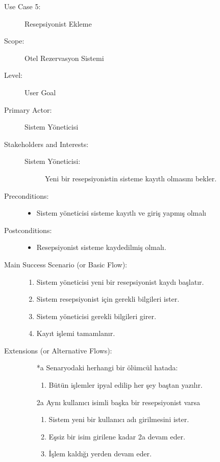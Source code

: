 \documentclass[12pt,a4paper]{report}
\begin{document}
\newpage
\begin{description}
\item[Use Case 5:] Resepsiyonist Ekleme\\
\item[Scope:] Otel Rezervasyon Sistemi
\item[Level:] User Goal
\item[Primary Actor:] Sistem Yöneticisi 
\item[Stakeholders and Interests:] \hspace{10 mm}
\begin{description} 
\item[Sistem Yöneticisi:] Yeni bir resepsiyonistin sisteme kayıtlı olmasını bekler.
\end{description}
\item[Preconditions:] \hspace{10mm}
\begin{itemize}
\item Sistem yöneticisi sisteme kayıtlı ve giriş yapmış olmalı
\end{itemize}

\item[Postconditions:] \hspace{10mm}
\begin{itemize}
\item Resepsiyonist sisteme kaydedilmiş olmalı.
\end{itemize}
\item[Main Success Scenario (or Basic Flow):] \hspace{10mm}
\begin{enumerate}
\item Sistem yöneticisi yeni bir resepsiyonist kaydı başlatır.
\item Sistem resepsiyonist için gerekli bilgileri ister.
\item Sistem yöneticisi gerekli bilgileri girer.
\item Kayıt işlemi tamamlanır.
\end{enumerate}
\item[Extensions (or Alternative Flows):] \hspace{10mm}
\begin{itemize}
\item[*a] Senaryodaki herhangi bir ölümcül hatada:
    \begin{enumerate}
    \item Bütün işlemler ipyal edilip her şey baştan yazılır.
    \end{enumerate}
\item[2a] Aynı kullanıcı isimli başka bir resepsiyonist varsa
    \begin{enumerate}
    \item Sistem yeni bir kullanıcı adı girilmesini ister.
    \item Eşsiz bir isim girilene kadar 2a devam eder.
    \item İşlem kaldığı yerden devam eder.
    \end{enumerate}
\end{itemize}
\end{description}
\end{document}
